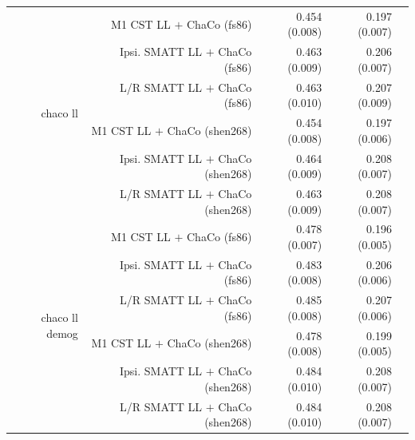 \documentclass[10pt]{article}
\def\Plus{\texttt{+}}
\begin{document}
\begin{table}[h]
\begin{tabular}{rrrrr}
\multirow[t]{6}{*}{chaco ll} & M1 CST LL $\Plus$ ChaCo (fs86) & 0.454 (0.008) & 0.197 (0.007) \\
 & Ipsi. SMATT LL $\Plus$ ChaCo (fs86) & 0.463 (0.009) & 0.206 (0.007) \\
 & L/R SMATT LL $\Plus$ ChaCo (fs86) & 0.463 (0.010) & 0.207 (0.009) \\
 & M1 CST LL $\Plus$ ChaCo (shen268) & 0.454 (0.008) & 0.197 (0.006) \\
 & Ipsi. SMATT LL $\Plus$ ChaCo (shen268) & 0.464 (0.009) & 0.208 (0.007) \\
 & L/R SMATT LL $\Plus$ ChaCo (shen268) & 0.463 (0.009) & 0.208 (0.007) \\
\multirow[t]{6}{*}{chaco ll demog} & M1 CST LL $\Plus$ ChaCo  (fs86) & 0.478 (0.007) & 0.196 (0.005) \\
 & Ipsi. SMATT LL $\Plus$ ChaCo  (fs86) & 0.483 (0.008) & 0.206 (0.006) \\
 & L/R SMATT LL $\Plus$ ChaCo  (fs86) & 0.485 (0.008) & 0.207 (0.006) \\
 & M1 CST LL $\Plus$ ChaCo  (shen268) & 0.478 (0.008) & 0.199 (0.005) \\
 & Ipsi. SMATT LL $\Plus$ ChaCo  (shen268) & 0.484 (0.010) & 0.208 (0.007) \\
 & L/R SMATT LL $\Plus$ ChaCo  (shen268) & 0.484 (0.010) & 0.208 (0.007) \\
\bottomrule
\end{tabular}
\end{table}
\end{document}
